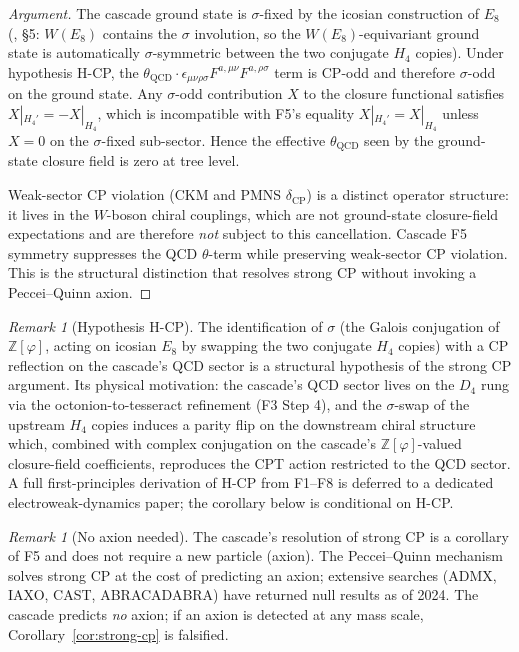 \documentclass[12pt]{article}
\theoremstyle{definition}
\theoremstyle{remark}
\newtheorem{remark}[theorem]{Remark}
\newcommand{\Zphi}{\mathbb{Z}[\varphi]}
\begin{document}
\begin{proof}[Argument]
The cascade ground state is $\sigma$-fixed by the icosian construction of $E_8$ (\citep{SmartXXXVI}, \S5: $W(E_8)$ contains the $\sigma$ involution, so the $W(E_8)$-equivariant ground state is automatically $\sigma$-symmetric between the two conjugate $H_4$ copies). Under hypothesis H-CP, the $\theta_{\mathrm{QCD}} \cdot \epsilon_{\mu\nu\rho\sigma} F^{a,\mu\nu} F^{a,\rho\sigma}$ term is CP-odd and therefore $\sigma$-odd on the ground state. Any $\sigma$-odd contribution $X$ to the closure functional satisfies $X|_{H_4'} = -X|_{H_4}$, which is incompatible with F5's equality $X|_{H_4'} = X|_{H_4}$ unless $X = 0$ on the $\sigma$-fixed sub-sector. Hence the effective $\theta_{\mathrm{QCD}}$ seen by the ground-state closure field is zero at tree level.

Weak-sector CP violation (CKM and PMNS $\delta_{\mathrm{CP}}$) is a distinct operator structure: it lives in the $W$-boson chiral couplings, which are not ground-state closure-field expectations and are therefore \emph{not} subject to this cancellation. Cascade F5 symmetry suppresses the QCD $\theta$-term while preserving weak-sector CP violation. This is the structural distinction that resolves strong CP without invoking a Peccei--Quinn axion.
\end{proof}

\begin{remark}[Hypothesis H-CP]\label{rem:sigma-cp}
The identification of $\sigma$ (the Galois conjugation of $\Zphi$, acting on icosian $E_8$ by swapping the two conjugate $H_4$ copies) with a CP reflection on the cascade's QCD sector is a structural hypothesis of the strong CP argument. Its physical motivation: the cascade's QCD sector lives on the $D_4$ rung via the octonion-to-tesseract refinement (F3 Step 4), and the $\sigma$-swap of the upstream $H_4$ copies induces a parity flip on the downstream chiral structure which, combined with complex conjugation on the cascade's $\Zphi$-valued closure-field coefficients, reproduces the CPT action restricted to the QCD sector. A full first-principles derivation of H-CP from F1--F8 is deferred to a dedicated electroweak-dynamics paper; the corollary below is conditional on H-CP.
\end{remark}

\begin{remark}[No axion needed]
The cascade's resolution of strong CP is a corollary of F5 and does not require a new particle (axion). The Peccei--Quinn mechanism~\citep{PQ1977} solves strong CP at the cost of predicting an axion; extensive searches (ADMX, IAXO, CAST, ABRACADABRA) have returned null results as of 2024. The cascade predicts \emph{no} axion; if an axion is detected at any mass scale, Corollary~\ref{cor:strong-cp} is falsified.
\end{remark}
\end{document}
